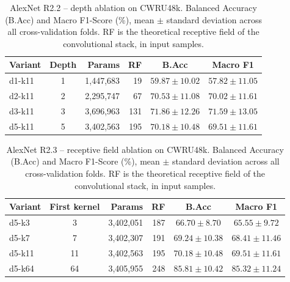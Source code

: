 \begin{table}[ht]
\centering
\caption{AlexNet R2.2 -- depth ablation on CWRU48k. Balanced Accuracy (B.Acc) and Macro F1-Score (\%), mean $\pm$ standard deviation across all cross-validation folds. RF is the theoretical receptive field of the convolutional stack, in input samples.}
\label{tab:ablation_alexnet_depth_cwru48k}
\begin{tabular}{@{}l c r r c c@{}}
\toprule
\textbf{Variant} & \textbf{Depth} & \textbf{Params} & \textbf{RF} & \textbf{B.Acc} & \textbf{Macro F1} \\ \midrule
d1-k11 & 1 & 1,447,683 & 19 & $59.87 \pm 10.02$ & $57.82 \pm 11.05$ \\
d2-k11 & 2 & 2,295,747 & 67 & $70.53 \pm 11.08$ & $70.02 \pm 11.61$ \\
d3-k11 & 3 & 3,696,963 & 131 & $71.86 \pm 12.26$ & $71.59 \pm 13.05$ \\
d5-k11 & 5 & 3,402,563 & 195 & $70.18 \pm 10.48$ & $69.51 \pm 11.61$ \\
\bottomrule
\end{tabular}
\end{table}

\begin{table}[ht]
\centering
\caption{AlexNet R2.3 -- receptive field ablation on CWRU48k. Balanced Accuracy (B.Acc) and Macro F1-Score (\%), mean $\pm$ standard deviation across all cross-validation folds. RF is the theoretical receptive field of the convolutional stack, in input samples.}
\label{tab:ablation_alexnet_kernel_cwru48k}
\begin{tabular}{@{}l c r r c c@{}}
\toprule
\textbf{Variant} & \textbf{First kernel} & \textbf{Params} & \textbf{RF} & \textbf{B.Acc} & \textbf{Macro F1} \\ \midrule
d5-k3 & 3 & 3,402,051 & 187 & $66.70 \pm 8.70$ & $65.55 \pm 9.72$ \\
d5-k7 & 7 & 3,402,307 & 191 & $69.24 \pm 10.38$ & $68.41 \pm 11.46$ \\
d5-k11 & 11 & 3,402,563 & 195 & $70.18 \pm 10.48$ & $69.51 \pm 11.61$ \\
d5-k64 & 64 & 3,405,955 & 248 & $85.81 \pm 10.42$ & $85.32 \pm 11.24$ \\
\bottomrule
\end{tabular}
\end{table}

